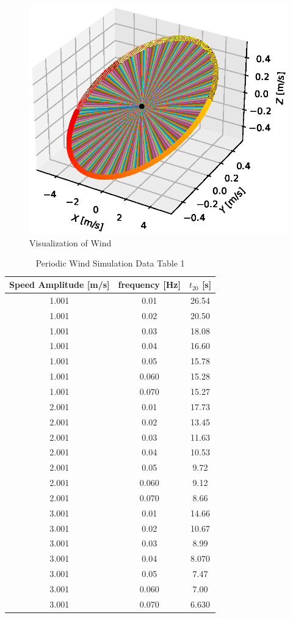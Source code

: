 \begin{figure}[H]
    \centering
    \includegraphics[width=.8\linewidth]{Images/wind_sin.eps}
    \caption{Visualization of Wind}
    \label{fig: windSin}
\end{figure}




 \begin{table}[H] 
 \centering 
 \begin{tabular}{|c|c|c|}
 \hline
 Speed Amplitude [m/s] & frequency [Hz] & $t_{20}$ [s] \\ \hline


1.001 & 0.01 & 26.54 \\ \hline
1.001 & 0.02 & 20.50 \\ \hline
1.001 & 0.03 & 18.08 \\ \hline
1.001 & 0.04 & 16.60\\ \hline
1.001 & 0.05 & 15.78 \\ \hline
1.001 & 0.060 & 15.28 \\ \hline
1.001 & 0.070 & 15.27 \\ \hline
2.001 & 0.01 & 17.73 \\ \hline
2.001 & 0.02 & 13.45 \\ \hline
2.001 & 0.03 & 11.63 \\ \hline
2.001 & 0.04 & 10.53 \\ \hline
2.001 & 0.05 & 9.72 \\ \hline
2.001 & 0.060 & 9.12 \\ \hline
2.001 & 0.070 & 8.66 \\ \hline
3.001 & 0.01 & 14.66 \\ \hline
3.001 & 0.02 & 10.67 \\ \hline
3.001 & 0.03 & 8.99 \\ \hline
3.001 & 0.04 & 8.070\\ \hline
3.001 & 0.05 & 7.47 \\ \hline
3.001 & 0.060 & 7.00 \\ \hline
3.001 & 0.070 & 6.630\\ \hline



 \end{tabular}%
 \caption{Periodic Wind Simulation Data Table 1} 
 \label{tab: simSin}%
 \end{table}%

